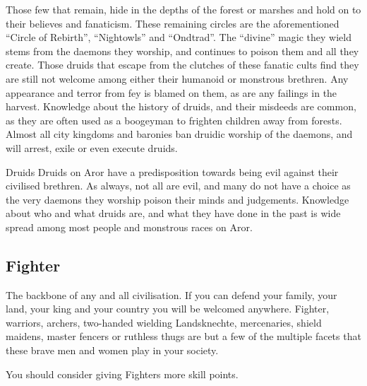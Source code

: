 Those few that remain, hide in the depths of the forest or marshes and hold on
to their believes and fanaticism. These remaining circles are the aforementioned
``Circle of Rebirth'', ``Nightowls'' and ``Ondtrad''. The ``divine'' magic they
wield stems from the daemons they worship, and continues to poison them and all
they create. Those druids that escape from the clutches of these fanatic cults
find they are still not welcome among either their humanoid or monstrous
brethren. Any appearance and terror from fey is blamed on them, as are any
failings in the harvest. Knowledge about the history of druids, and their
misdeeds are common, as they are often used as a boogeyman to frighten
children away from forests. Almost all city kingdoms and baronies ban druidic
worship of the daemons, and will arrest, exile or even execute druids.


\begin{35e}{Druids}
  Druids on Aror have a predisposition towards being evil against their
  civilised brethren. As always, not all are evil, and many do not have a
  choice as the very daemons they worship poison their minds and judgements.
  Knowledge about who and what druids are, and what they have done in the
  past is wide spread among most people and monstrous races on Aror.
\end{35e}

\subsection{Fighter}
\label{sec:Fighter}

The backbone of any and all civilisation. If you can defend your family, your
land, your king and your country you will be welcomed anywhere. Fighter,
warriors, archers, two-handed wielding Landsknechte, mercenaries, shield
maidens, master fencers or ruthless thugs are but a few of the multiple
facets that these brave men and women play in your society.


\begin{note}
  You should consider giving Fighters more skill points.
\end{note}

